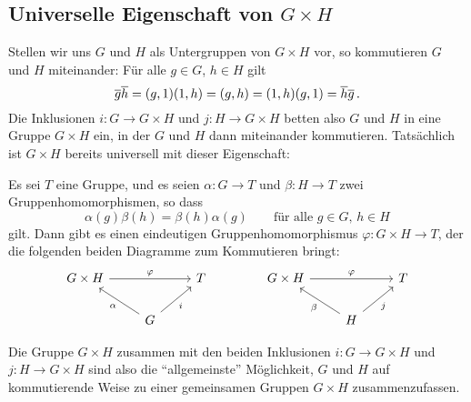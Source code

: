 \subsection*{Universelle Eigenschaft von \texorpdfstring{$G \times H$}{G x H}}

Stellen wir uns $G$ und $H$ als Untergruppen von $G \times H$ vor, so kommutieren $G$ und $H$ miteinander:
Für alle $g \in G$, $h \in H$ gilt
\[
    \overline{g} \overline{h}
  = (g, 1) (1, h)
  = (g, h)
  = (1, h) (g, 1)
  = \overline{h} \overline{g} \,.
\]
Die Inklusionen $i \colon G \to G \times H$ und $j \colon H \to G \times H$ betten also $G$ und $H$ in eine Gruppe $G \times H$ ein, in der $G$ und $H$ dann miteinander kommutieren.
Tatsächlich ist $G \times H$ bereits universell mit dieser Eigenschaft:

\begin{proposition}
  Es sei $T$ eine Gruppe, und es seien $\alpha \colon G \to T$ und $\beta \colon H \to T$ zwei Gruppenhomomorphismen, so dass
  \[
      \alpha(g) \beta(h)
    = \beta(h) \alpha(g)
    \qquad
    \text{für alle $g \in G$, $h \in H$}
  \]
  gilt.
  Dann gibt es einen eindeutigen Gruppenhomomorphismus $\varphi \colon G \times H \to T$, der die folgenden beiden Diagramme zum Kommutieren bringt:
  \[
    \begin{tikzcd}
        G \times H
        \arrow{rr}{\varphi}
      & {}
      & T
      \\
        {}
      & G
        \arrow[swap]{ru}{i}
        \arrow{lu}{\alpha}
      & {}
    \end{tikzcd}
    \qquad\qquad
    \begin{tikzcd}
        G \times H
        \arrow{rr}{\varphi}
      & {}
      & T
      \\
        {}
      & H
        \arrow[swap]{ru}{j}
        \arrow{lu}{\beta}
      & {}
    \end{tikzcd}
  \]
\end{proposition}

Die Gruppe $G \times H$ zusammen mit den beiden Inklusionen $i \colon G \to G \times H$ und $j \colon H \to G \times H$ sind also die \enquote{allgemeinste} Möglichkeit, $G$ und $H$ auf kommutierende Weise zu einer gemeinsamen Gruppen $G \times H$ zusammenzufassen.

